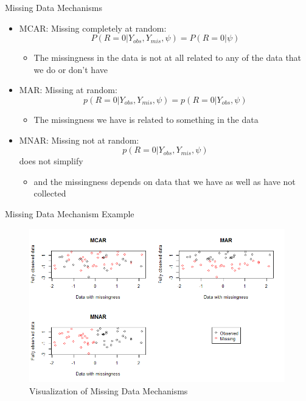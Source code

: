 \begin{frame}{Missing Data Mechanisms}
\begin{itemize}

\item MCAR: Missing completely at random:  $$P(R=0|Y_{obs},Y_{mis},\psi)=P(R=0|\psi)$$
\begin{itemize}
\item The missingness in the data is not at all related to any of the data that we do or don't have
\end{itemize}
\item MAR: Missing at random: $$p(R=0|Y_{obs},Y_{mis},\psi)= p(R=0|Y_{obs},\psi)$$
\begin{itemize}
 \item The missingness we have is related to something in the data 
\end{itemize}
\item MNAR: Missing not at random: $$p(R=0|Y_{obs},Y_{mis},\psi)$$ does not simplify
\begin{itemize}
 \item  and the missingness depends on data that we have as well as have not collected
\end{itemize}
\end{itemize}
\end{frame}

\begin{frame}{Missing Data Mechanism Example}

 \begin{figure}[h!]
  \centering
    \includegraphics[width=0.99\textwidth]{md_mechanism}
  \caption{Visualization of Missing Data Mechanisms}
\label{fig:miviz}
\end{figure}
 
\end{frame}

